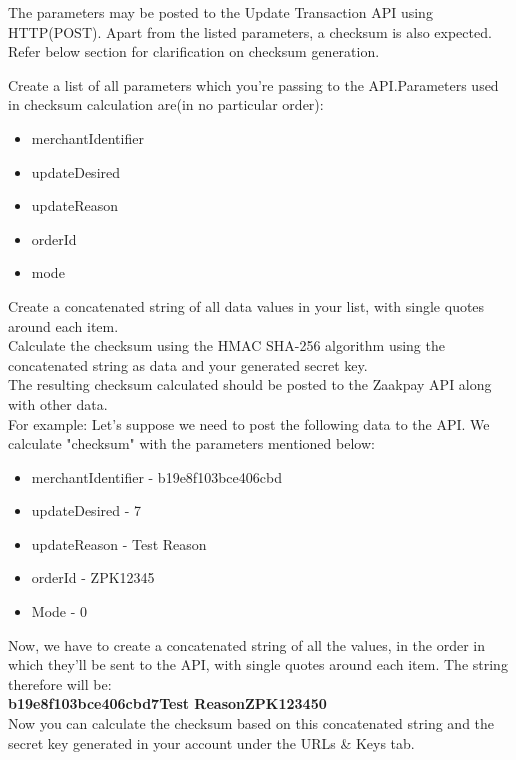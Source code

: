 \documentclass{article}
\begin{document}
The parameters may be posted to the Update Transaction API using HTTP(POST). Apart from the listed parameters, a checksum is also expected. Refer below section for clarification on checksum generation.

Create a list of all parameters which you're passing to the API.Parameters used in checksum calculation are(in no particular order):

\begin{itemize}
\item merchantIdentifier
\item updateDesired
\item updateReason
\item orderId
\item mode
\end{itemize}

Create a concatenated string of all data values in your list, with single quotes around each item. \\
Calculate the checksum using the HMAC SHA-256 algorithm using the concatenated string as data and your generated secret key.\\
The resulting checksum calculated should be posted to the Zaakpay API along with other data.\\
For example: Let's suppose we need to post the following data to the API. We calculate "checksum" with the parameters mentioned below:\\
\begin{itemize}
\item merchantIdentifier - b19e8f103bce406cbd
\item updateDesired - 7
\item updateReason - Test Reason
\item orderId - ZPK12345
\item Mode - 0
\end{itemize}

Now, we have to create a concatenated string of all the values, in the order in which they'll be sent to the API, with single quotes around each item. The string therefore will be:\\
{\bfseries \textquotesingle{}b19e8f103bce406cbd\textquotesingle{}\textquotesingle{}7\textquotesingle{}\textquotesingle{}Test Reason\textquotesingle{}\textquotesingle{}ZPK12345\textquotesingle{}\textquotesingle{}0\textquotesingle{}} \\
Now you can calculate the checksum based on this concatenated string and the secret key
generated in your account under the URLs \& Keys tab. \\
\end{document}
